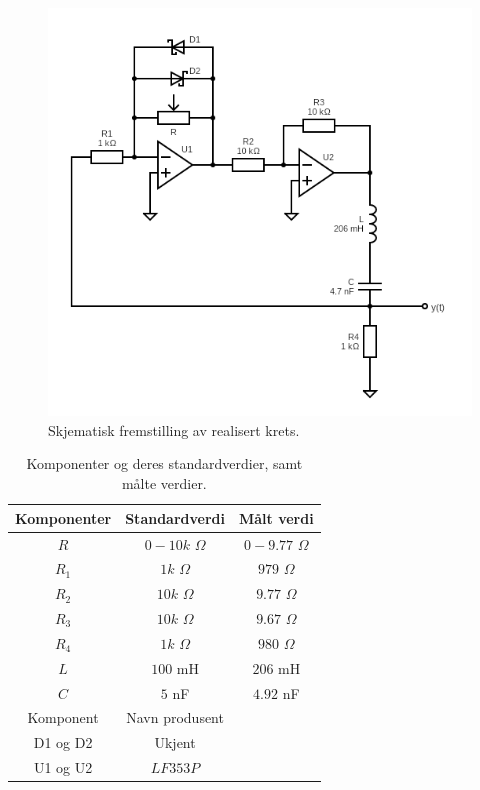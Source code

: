 \documentclass[a4paper,11pt,norsk]{article}
\begin{document}
\begin{figure}[H]
  \centering
  \includegraphics[scale=0.65]{D1/Images/withValues.png}
  \caption{Skjematisk fremstilling av realisert krets.}
  \label{fig:schematic}
\end{figure}

\begin{table}[H]
  \centering
  \caption{Komponenter og deres standardverdier, samt målte verdier.}
  \label{tab:komp}
  \begin{tabular}{|c|c|c|}
    \hline\hline
    Komponenter & Standardverdi & Målt verdi \\
    \hline\hline
    $R$   & $0-10k$ $\Omega$ & $0-9.77$ $\Omega$\\
    \hline
    $R_1$   & $1k$ $\Omega$ & $979$ $\Omega$\\
    \hline
    $R_2$   & $10k$ $\Omega$ & $9.77$ $\Omega$\\
    \hline
    $R_3$   & $10k$ $\Omega$ & $9.67$ $\Omega$\\
    \hline
    $R_4$   & $1k$ $\Omega$ & $980$ $\Omega$\\
    \hline
    $L$   & $100$ mH       & $206$ mH\\
    \hline
    $C$   & $5$ nF       & $4.92$ nF\\
    \hline\hline
    Komponent & Navn produsent &\\
    \hline
    D1 og D2 & Ukjent &\\
    \hline
    U1 og U2 & $LF353P$ &\\
    \hline
  \end{tabular}
\end{table}
\end{document}
